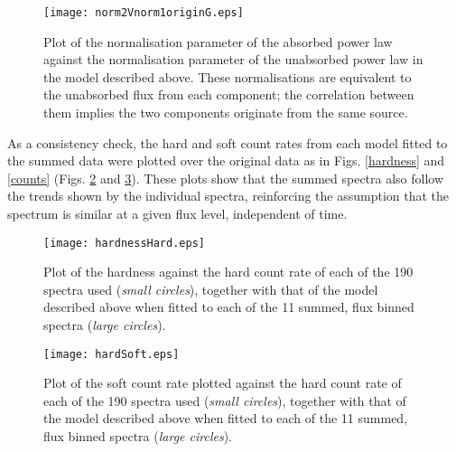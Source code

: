 \documentclass[useAMS,usenatbib]{sam}
\begin{document}
\begin{figure}
	
	\texttt{[image: norm2Vnorm1originG.eps]}\hspace{1pt}
	\caption{Plot of the normalisation parameter of the absorbed power law 
		against the normalisation parameter of the unabsorbed power law in
		the model described above. These normalisations are equivalent to the unabsorbed flux from
	        each component; the correlation between them implies the two components originate from the same source.}
	
	\label{normplots}
\end{figure}  
		

As a consistency check, the hard and soft count rates from each model fitted to the summed data were plotted over the original data as in Figs. \ref{hardness} and
\ref{counts}  (Figs. \ref{modelhardness} and \ref{modelcounts}). These plots show that the summed spectra also follow the trends shown by the individual spectra,
reinforcing the assumption that the spectrum is similar at a given flux level, independent of time.


\begin{figure}

	\texttt{[image: hardnessHard.eps]}
	
	\caption{Plot of the hardness against the hard count rate of each of the 190 spectra used ({\it small circles}), together with that of the model described above
when fitted to each of the 11 summed, flux binned spectra ({\it large circles}).}
	\label{modelhardness}
	
\end{figure}

\begin{figure}

	\texttt{[image: hardSoft.eps]}
	
	\caption{Plot of the soft count rate plotted against the hard count rate of each of the 190 spectra used ({\it small circles}), together with that of the model
described above when fitted to each of the 11 summed, flux binned spectra ({\it large circles}).}
	\label{modelcounts}
	
\end{figure}
\end{document}
